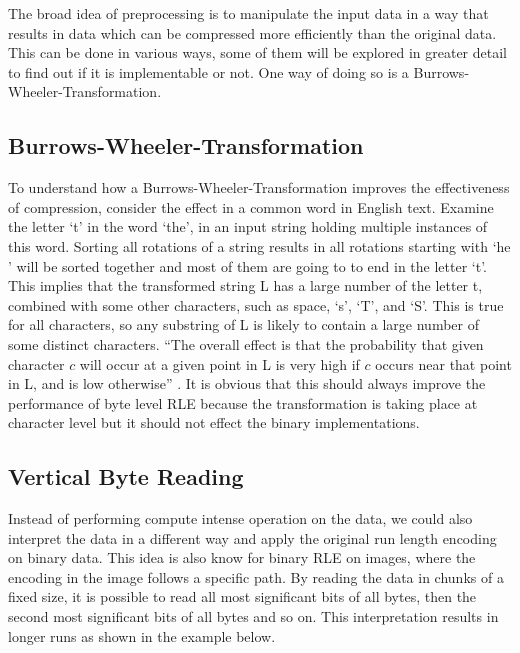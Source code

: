 The broad idea of preprocessing is to manipulate the input data in a way that results in data which can be compressed more efficiently than the original data. This can be done in various ways, some of them will be explored in greater detail to find out if it is implementable or not. One way of doing so is a Burrows-Wheeler-Transformation.

\subsection{Burrows-Wheeler-Transformation}
\label{ch:Analysis:sec:Improvements by Preprocessing:subSec:bwt}
\par{
To understand how a Burrows-Wheeler-Transformation improves the effectiveness of compression, consider the effect in a common word in English text. Examine the letter ‘t’ in the word ‘the’, in an input string holding multiple instances of this word. Sorting all rotations of a string results in all rotations starting with ‘he ’ will be sorted together and most of them are going to to end in the letter ‘t’. This implies that the transformed string L has a large number of the letter t, combined with some other characters, such as space, ‘s’, ‘T’, and ‘S’. This is true for all characters, so any substring of L is likely to contain a large number of some distinct characters. \enquote{The overall effect is that the probability that given character $c$ will occur at a given point in L is very high if $c$ occurs near that point in L, and is low otherwise} \cite{Burrows94}. It is obvious that this should always improve the performance of byte level RLE because the transformation is taking place at character level but it should not effect the binary implementations. 
}

\subsection{Vertical Byte Reading}
\label{ch:Analysis:sec:Improvements by Preprocessing:subSec:vertReading}
Instead of performing compute intense operation on the data, we could also interpret the data in a different way and apply the original run length encoding on binary data. This idea is also know for binary RLE on images, where the encoding in the image follows a specific path. By reading the data in chunks of a fixed size, it is possible to read all most significant bits of all bytes, then the second most significant bits of all bytes and so on. This interpretation results in longer runs as shown in the example below.



